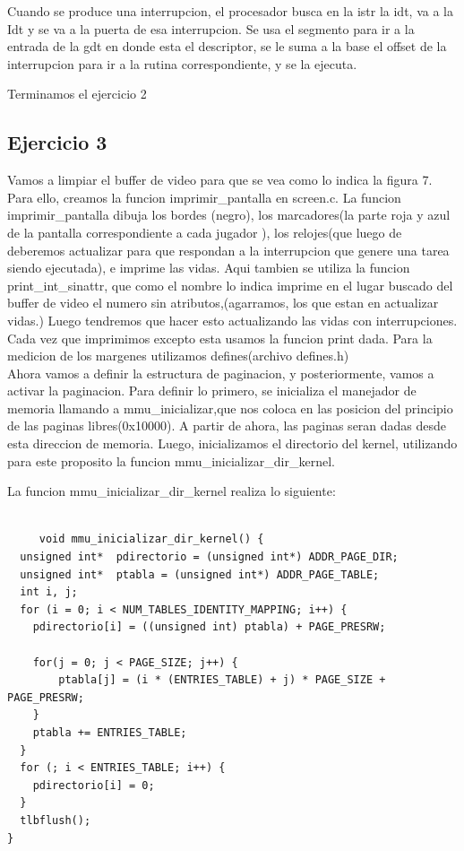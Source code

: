 \documentclass[a4paper]{article}
\newenvironment{codesnippet}{%
	\begin{Sbox}\begin{minipage}{\textwidth}\sffamily\small}%
	{\end{minipage}\end{Sbox}%
		\begin{center}%
		\vspace{-0.4cm}\colorbox{litegrey}{\TheSbox}\end{center}\vspace{0.3cm}}
\begin{document}
	
	Cuando se produce una interrupcion, el procesador busca en la istr la idt, va a la Idt y se va a la puerta de esa interrupcion.
	Se usa el segmento para ir a la entrada de la gdt en  donde esta el descriptor, se le suma a la base el offset de la interrupcion para ir a la rutina correspondiente, y se la ejecuta.
	 
Terminamos el ejercicio 2
	

\subsection{Ejercicio 3}

Vamos a limpiar el buffer de video para que se vea como lo indica la figura 7. Para ello, creamos la funcion imprimir_pantalla en screen.c.
	La funcion imprimir_pantalla dibuja los bordes (negro), los marcadores(la parte roja y azul de la pantalla correspondiente a cada jugador ), los relojes(que luego de deberemos actualizar para que respondan a la interrupcion que genere una tarea siendo ejecutada), e imprime las vidas. Aqui tambien se utiliza la funcion print_int_sinattr, que como el nombre lo indica imprime en el lugar buscado del buffer de video el numero sin atributos,(agarramos, los que estan en actualizar vidas.)
	Luego tendremos que hacer esto actualizando las vidas con interrupciones. Cada vez que imprimimos excepto esta usamos la funcion print dada. Para la medicion de los margenes utilizamos defines(archivo defines.h)
	\\
	
	Ahora vamos a  definir la estructura de paginacion, y posteriormente, vamos a activar la paginacion.
	Para definir lo primero, se inicializa el manejador de memoria llamando a mmu_inicializar,que nos coloca en las posicion del principio de las paginas libres(0x10000).
	A partir de ahora, las paginas seran dadas desde esta direccion de memoria. Luego, inicializamos el directorio del kernel, utilizando para este proposito la funcion mmu_inicializar_dir_kernel.
	
	 
	 La funcion mmu_inicializar_dir_kernel realiza lo siguiente:
	
\begin{codesnippet}
\begin{verbatim}	 

	 void mmu_inicializar_dir_kernel() {
  unsigned int*  pdirectorio = (unsigned int*) ADDR_PAGE_DIR;
  unsigned int*  ptabla = (unsigned int*) ADDR_PAGE_TABLE;
  int i, j;
  for (i = 0; i < NUM_TABLES_IDENTITY_MAPPING; i++)	{
    pdirectorio[i] = ((unsigned int) ptabla) + PAGE_PRESRW;

    for(j = 0; j < PAGE_SIZE; j++) {
    	ptabla[j] = (i * (ENTRIES_TABLE) + j) * PAGE_SIZE + PAGE_PRESRW;
    }
    ptabla += ENTRIES_TABLE;
  }
  for (; i < ENTRIES_TABLE; i++) {
  	pdirectorio[i] = 0;
  }
  tlbflush();
}
\end{verbatim}
\end{codesnippet}
\end{document}
